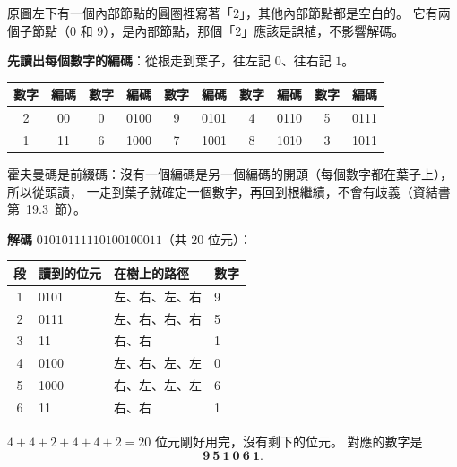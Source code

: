 \begin{pastsoln}
原圖左下有一個內部節點的圓圈裡寫著「2」，其他內部節點都是空白的。 它有兩個子節點（$0$ 和
$9$），是內部節點，那個「2」應該是誤植，不影響解碼。

\textbf{先讀出每個數字的編碼}：從根走到葉子，往左記 $0$、往右記 $1$。
\begin{center}
\begin{tabular}{cc|cc|cc|cc|cc}
\toprule
數字 & 編碼 & 數字 & 編碼 & 數字 & 編碼 & 數字 & 編碼 & 數字 & 編碼 \\
\midrule
2 & 00 & 0 & 0100 & 9 & 0101 & 4 & 0110 & 5 & 0111 \\
1 & 11 & 6 & 1000 & 7 & 1001 & 8 & 1010 & 3 & 1011 \\
\bottomrule
\end{tabular}
\end{center}
霍夫曼碼是前綴碼：沒有一個編碼是另一個編碼的開頭（每個數字都在葉子上），所以從頭讀，
一走到葉子就確定一個數字，再回到根繼續，不會有歧義（資結書第~19.3~節）。

\textbf{解碼} $01010111110100100011$（共 $20$ 位元）：
\begin{center}
\begin{tabular}{clll}
\toprule
段 & 讀到的位元 & 在樹上的路徑 & 數字 \\
\midrule
1 & 0101 & 左、右、左、右 & 9 \\
2 & 0111 & 左、右、右、右 & 5 \\
3 & 11 & 右、右 & 1 \\
4 & 0100 & 左、右、左、左 & 0 \\
5 & 1000 & 右、左、左、左 & 6 \\
6 & 11 & 右、右 & 1 \\
\bottomrule
\end{tabular}
\end{center}
$4 + 4 + 2 + 4 + 4 + 2 = 20$ 位元剛好用完，沒有剩下的位元。 對應的數字是
\[
\mathbf{9\ 5\ 1\ 0\ 6\ 1}.
\]
\end{pastsoln}
